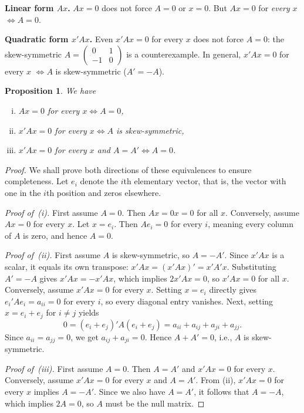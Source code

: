 \documentclass[14pt]{extarticle}
\theoremstyle{plain}
\newtheorem{proposition}{Proposition}
\theoremstyle{definition}
\theoremstyle{remark}
\begin{document}
\textbf{Linear form $Ax$.} $Ax = 0$ does not force $A = 0$ or $x = 0$. But $Ax = 0$ for \emph{every} $x$ $\iff A = 0$.

\textbf{Quadratic form $x'Ax$.} Even $x'Ax = 0$ for every $x$ does not force $A = 0$: the skew-symmetric $A = \left(\begin{smallmatrix} 0 & 1 \\ -1 & 0 \end{smallmatrix}\right)$ is a counterexample. In general, $x'Ax = 0$ for every $x$ $\iff A$ is skew-symmetric ($A' = -A$).

\begin{proposition}\label{prp:2}
We have
\begin{enumerate}[(i)]
\item $Ax = 0$ for every $x \iff A = 0$,
\item $x'Ax = 0$ for every $x \iff A$ is skew-symmetric,
\item $x'Ax = 0$ for every $x$ and $A = A' \iff A = 0$.
\end{enumerate}
\end{proposition}

\begin{proof}
We shall prove both directions of these equivalences to ensure completeness. Let $e_i$ denote the $i$th elementary vector, that is, the vector with one in the $i$th position and zeros elsewhere.

\emph{Proof of~(i).} First assume $A = 0$. Then $Ax = 0x = 0$ for all $x$. Conversely, assume $Ax = 0$ for every $x$. Let $x = e_i$. Then $Ae_i = 0$ for every $i$, meaning every column of $A$ is zero, and hence $A = 0$.

\emph{Proof of~(ii).} First assume $A$ is skew-symmetric, so $A = -A'$. Since $x'Ax$ is a scalar, it equals its own transpose: $x'Ax = (x'Ax)' = x'A'x$. Substituting $A' = -A$ gives $x'Ax = -x'Ax$, which implies $2x'Ax = 0$, so $x'Ax = 0$ for all $x$. Conversely, assume $x'Ax = 0$ for every $x$. Setting $x = e_i$ directly gives $e_i'Ae_i = a_{ii} = 0$ for every $i$, so every diagonal entry vanishes. Next, setting $x = e_i + e_j$ for $i \neq j$ yields
\[
0 = (e_i+e_j)'A(e_i+e_j) = a_{ii} + a_{ij} + a_{ji} + a_{jj}.
\]
Since $a_{ii} = a_{jj} = 0$, we get $a_{ij} + a_{ji} = 0$. Hence $A + A' = 0$, i.e., $A$ is skew-symmetric.

\emph{Proof of~(iii).} First assume $A = 0$. Then $A = A'$ and $x'Ax = 0$ for every $x$. Conversely, assume $x'Ax = 0$ for every $x$ and $A = A'$. From (ii), $x'Ax = 0$ for every $x$ implies $A = -A'$. Since we also have $A = A'$, it follows that $A = -A$, which implies $2A = 0$, so $A$ must be the null matrix.
\end{proof}
\end{document}

